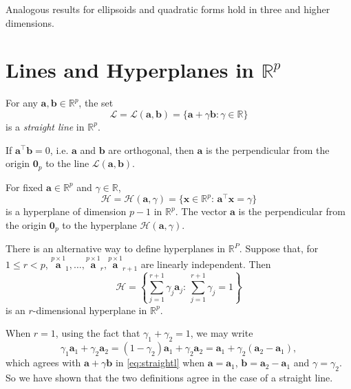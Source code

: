 \documentclass[]{book}
\theoremstyle{definition}
\theoremstyle{definition}
\theoremstyle{definition}
\theoremstyle{remark}
\begin{document}
Analogous results for ellipsoids and quadratic forms hold in three and higher dimensions.

\hypertarget{lines-and-hyperplanes-in-mathbbrp}{%
\section{\texorpdfstring{Lines and Hyperplanes in \(\mathbb{R}^p\)}{Lines and Hyperplanes in \textbackslash{}mathbb\{R\}\^{}p}}\label{lines-and-hyperplanes-in-mathbbrp}}

For any \(\boldsymbol a, \boldsymbol b\in \mathbb{R}^p\), the set
\begin{equation}
\mathcal{L}=\mathcal{L}(\boldsymbol a, \boldsymbol b)=\{\boldsymbol a+\gamma \boldsymbol b: \gamma \in \mathbb{R}\}
\label{eq:straightl} 
\end{equation}
is a \emph{straight line} in \(\mathbb{R}^p\).

If \(\boldsymbol a^\top \boldsymbol b=0\), i.e. \(\boldsymbol a\) and \(\boldsymbol b\) are orthogonal, then \(\boldsymbol a\) is the perpendicular from the origin \({\mathbf 0}_p\)
to the line \(\mathcal{L}(\boldsymbol a,\boldsymbol b)\).

For fixed \(\boldsymbol a\in \mathbb{R}^p\) and \(\gamma \in \mathbb{R}\),
\[
\mathcal{H}=\mathcal{H}(\boldsymbol a, \gamma) =\{\boldsymbol x\in \mathbb{R}^p:\, \boldsymbol a^\top \boldsymbol x=\gamma\}
\]
is a hyperplane of dimension \(p-1\) in \(\mathbb{R}^p\). The vector \(\boldsymbol a\) is the perpendicular from the origin \({\mathbf 0}_p\) to the hyperplane \(\mathcal{H}(\boldsymbol a, \gamma)\).

There is an alternative way to define hyperplanes in \(\mathbb{R}^P\). Suppose that, for \(1 \leq r <p\), \(\stackrel{p \times 1}{\boldsymbol a}_1, \ldots , \stackrel{p \times 1}{\boldsymbol a}_r, \stackrel{p \times 1}{\boldsymbol a}_{r+1}\) are linearly independent. Then
\[
\mathcal{H}=\left \{ \sum_{j=1}^{r+1} \gamma_j \boldsymbol a_j: \, \sum_{j=1}^{r+1}\gamma_j =1  \right \}
\]
is an \(r\)-dimensional hyperplane in \(\mathbb{R}^p\).

When \(r=1\), using the fact that \(\gamma_1+\gamma_2=1\), we may write
\[
\gamma_1 \boldsymbol a_1 + \gamma_2 \boldsymbol a_2=(1-\gamma_2)\boldsymbol a_1 + \gamma_2 \boldsymbol a_2 = \boldsymbol a_1 +\gamma_2(\boldsymbol a_2-\boldsymbol a_1),
\]
which agrees with \(\boldsymbol a+\gamma \boldsymbol b\) in \eqref{eq:straightl} when \(\boldsymbol a= \boldsymbol a_1\), \(\boldsymbol b= \boldsymbol a_2 -\boldsymbol a_1\) and \(\gamma=\gamma_2\). So we have shown that the two definitions agree in the case of a straight line.
\end{document}
